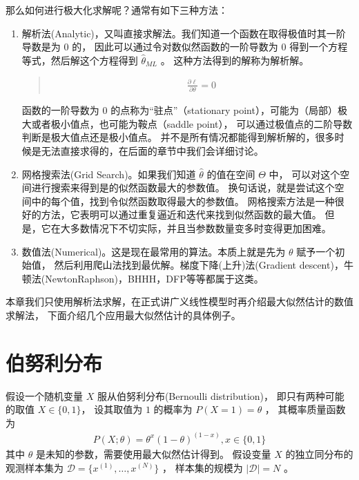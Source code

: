 \documentclass[letterpaper,10pt,english]{sphinxmanual}
\begin{document}
那么如何进行极大化求解呢？通常有如下三种方法：
\begin{enumerate}
%
\item {} 
解析法(Analytic)，又叫直接求解法。我们知道一个函数在取得极值时其一阶导数是为 \(0\) 的，
因此可以通过令对数似然函数的一阶导数为 \(0\) 得到一个方程等式，然后解这个方程得到 \(\hat{\theta}_{ML}\) 。
这种方法得到的解称为解析解。
\begin{quote}
\begin{equation}\label{equation:最大似然估计/content:最大似然估计/content:5}
\begin{split}\frac{\partial \ell}{\partial \theta} = 0\end{split}
\end{equation}\end{quote}

函数的一阶导数为 \(0\) 的点称为“驻点”（stationary point），可能为（局部）极大或者极小值点，也可能为鞍点（saddle point），
可以通过极值点的二阶导数判断是极大值点还是极小值点。
并不是所有情况都能得到解析解的，很多时候是无法直接求得的，在后面的章节中我们会详细讨论。

\item {} 
网格搜索法(Grid Search)。如果我们知道 \(\hat{\theta}\) 的值在空间 \(\Theta\) 中，
可以对这个空间进行搜索来得到是的似然函数最大的参数值。
换句话说，就是尝试这个空间中的每个值，找到令似然函数取得最大的参数值。
网格搜索方法是一种很好的方法，它表明可以通过重复逼近和迭代来找到似然函数的最大值。
但是，它在大多数情况下不切实际，并且当参数数量变多时变得更加困难。

\item {} 
数值法(Numerical)。这是现在最常用的算法。本质上就是先为 \(\theta\) 赋予一个初始值，
然后利用爬山法找到最优解。梯度下降(上升)法(Gradient descent)，牛顿法(Newton\sphinxhyphen{}Raphson)，BHHH，DFP等等都属于这类。

\end{enumerate}

本章我们只使用解析法求解，在正式讲广义线性模型时再介绍最大似然估计的数值求解法，
下面介绍几个应用最大似然估计的具体例子。


\section{伯努利分布}
\label{\detokenize{_u6700_u5927_u4f3c_u7136_u4f30_u8ba1/content:id3}}
假设一个随机变量 \(X\) 服从伯努利分布(Bernoulli distribution)，
即只有两种可能的取值 \(X \in \{0,1\}\)，
设其取值为 \(1\) 的概率为 \(P(X=1)=\theta\) ，
其概率质量函数为
\begin{equation}\label{equation:最大似然估计/content:最大似然估计/content:6}
\begin{split}P(X;\theta) = \theta^x (1-\theta)^{(1-x)},x \in \{0,1\}\end{split}
\end{equation}
其中 \(\theta\) 是未知的参数，需要使用最大似然估计得到。
假设变量 \(X\) 的独立同分布的观测样本集为
\(\mathcal{D}=\{x^{(1)},\ldots,x^{(N)}\}\) ，
样本集的规模为 \(|\mathcal{D}|=N\) 。
\end{document}
